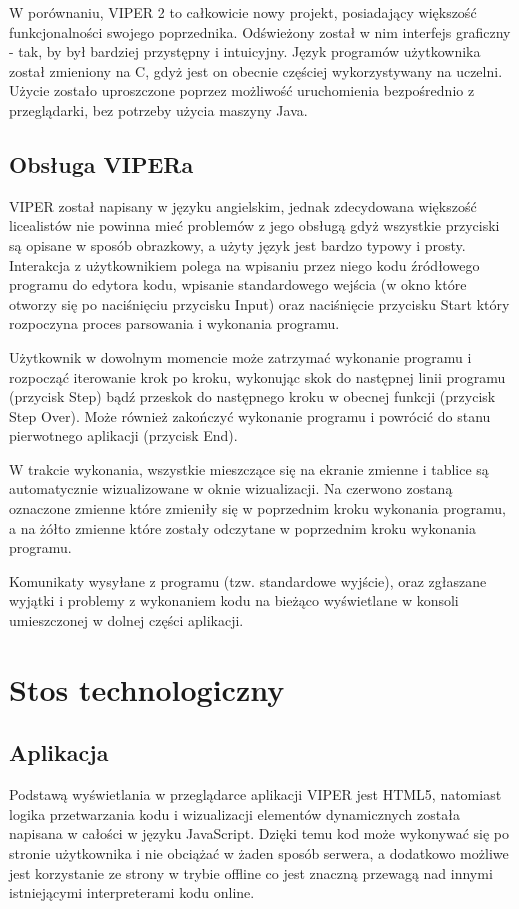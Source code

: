 \documentclass[a4paper,twoside,openright,11pt]{report}
\begin{document}
\par W porównaniu, VIPER 2 to całkowicie nowy projekt, posiadający większość funkcjonalności swojego poprzednika. Odświeżony został w nim interfejs graficzny - tak, by był bardziej przystępny i intuicyjny. Język programów użytkownika został zmieniony na C, gdyż jest on obecnie częściej wykorzystywany na uczelni. Użycie zostało uproszczone poprzez możliwość uruchomienia bezpośrednio z przeglądarki, bez potrzeby użycia maszyny Java.

  \section{Obsługa VIPERa}
\par VIPER został napisany w języku angielskim, jednak zdecydowana większość licealistów nie powinna mieć problemów z jego obsługą gdyż wszystkie przyciski są opisane w sposób obrazkowy, a użyty język jest bardzo typowy i prosty. Interakcja z użytkownikiem polega na wpisaniu przez niego kodu źródłowego programu do edytora kodu, wpisanie standardowego wejścia (w okno które otworzy się po naciśnięciu przycisku Input) oraz naciśnięcie przycisku Start który rozpoczyna proces parsowania i wykonania programu. 
\par Użytkownik w dowolnym momencie może zatrzymać wykonanie programu i rozpocząć iterowanie krok po kroku, wykonując skok do następnej linii programu (przycisk Step) bądź przeskok do następnego kroku w obecnej funkcji (przycisk Step Over). Może również zakończyć wykonanie programu i powrócić do stanu pierwotnego aplikacji (przycisk End).
\par W trakcie wykonania, wszystkie mieszczące się na ekranie zmienne i tablice są automatycznie wizualizowane w oknie wizualizacji. Na czerwono zostaną oznaczone zmienne które zmieniły się w poprzednim kroku wykonania programu, a na żółto zmienne które zostały odczytane w poprzednim kroku wykonania programu. 
\par Komunikaty wysyłane z programu (tzw. standardowe wyjście), oraz zgłaszane wyjątki i problemy z wykonaniem kodu na bieżąco wyświetlane w konsoli umieszczonej w dolnej części aplikacji. 

  \chapter{Stos technologiczny}

  \section{Aplikacja}
\par Podstawą wyświetlania w przeglądarce aplikacji VIPER jest HTML5, natomiast logika przetwarzania kodu i wizualizacji elementów dynamicznych została napisana w całości w języku JavaScript. Dzięki temu kod może wykonywać się po stronie użytkownika i nie obciążać w żaden sposób serwera, a dodatkowo możliwe jest korzystanie ze strony w trybie offline co jest znaczną przewagą nad innymi istniejącymi interpreterami kodu online.
\end{document}
